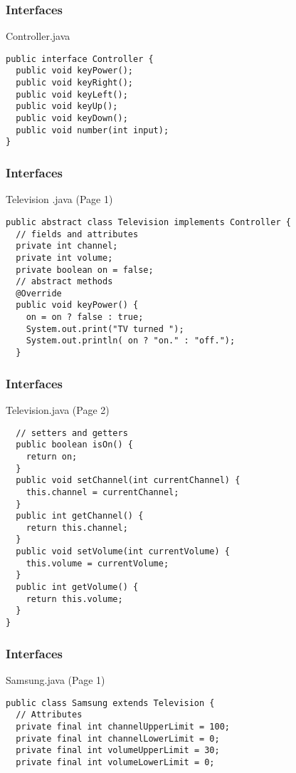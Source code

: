 \documentclass[10pt, compress]{beamer}
\begin{document}
\begin{frame}[fragile]
  \frametitle{Interfaces}
  \begin{block}{Controller.java}
    \begin{verbatim}
public interface Controller {
  public void keyPower();
  public void keyRight();
  public void keyLeft();
  public void keyUp();
  public void keyDown();
  public void number(int input);
}
    \end{verbatim}
  \end{block}
\end{frame}

\begin{frame}[fragile]
  \frametitle{Interfaces}
  \begin{block}{Television .java (Page 1)}
    \begin{verbatim}
public abstract class Television implements Controller {
  // fields and attributes
  private int channel;
  private int volume;
  private boolean on = false;
  // abstract methods
  @Override
  public void keyPower() {
    on = on ? false : true;
    System.out.print("TV turned ");
    System.out.println( on ? "on." : "off.");
  }
    \end{verbatim}
  \end{block}
\end{frame}

\begin{frame}[fragile]
  \frametitle{Interfaces}
  \begin{block}{Television.java (Page 2)}
    \begin{verbatim}
  // setters and getters
  public boolean isOn() {
    return on;
  }
  public void setChannel(int currentChannel) {
    this.channel = currentChannel;
  }
  public int getChannel() {
    return this.channel;
  }
  public void setVolume(int currentVolume) {
    this.volume = currentVolume;
  }
  public int getVolume() {
    return this.volume;
  }
}
    \end{verbatim}
  \end{block}
\end{frame}

\begin{frame}[fragile]
  \frametitle{Interfaces}
  \begin{block}{Samsung.java (Page 1)}
    \begin{verbatim}
public class Samsung extends Television {
  // Attributes
  private final int channelUpperLimit = 100;
  private final int channelLowerLimit = 0;
  private final int volumeUpperLimit = 30;
  private final int volumeLowerLimit = 0;
    \end{verbatim}
  \end{block}
\end{frame}
\end{document}
